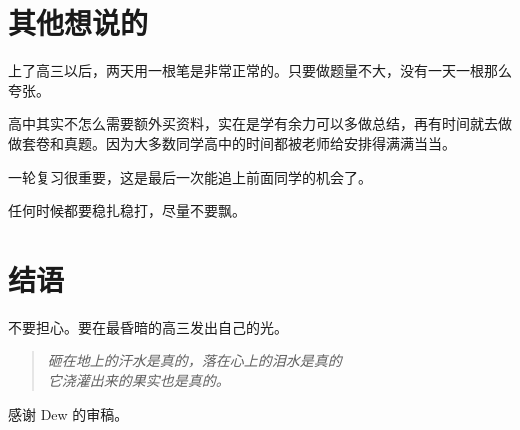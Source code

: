 \documentclass[UTF8,11pt,a4paper]{ctexart}
\begin{document}
	\section{其他想说的}
		上了高三以后，两天用一根笔是非常正常的。只要做题量不大，没有一天一根那么夸张。
		
		高中其实不怎么需要额外买资料，实在是学有余力可以多做总结，再有时间就去做做套卷和真题。因为大多数同学高中的时间都被老师给安排得满满当当。
		
		一轮复习很重要，这是最后一次能追上前面同学的机会了。
		
		任何时候都要稳扎稳打，尽量不要飘。
	\section{结语}
		不要担心。要在最昏暗的高三发出自己的光。
		
		\begin{quote}
		\it 砸在地上的汗水是真的，落在心上的泪水是真的\\
		它浇灌出来的果实也是真的。
		\end{quote}
		
		感谢 Dew 的审稿。
		
\end{document}
